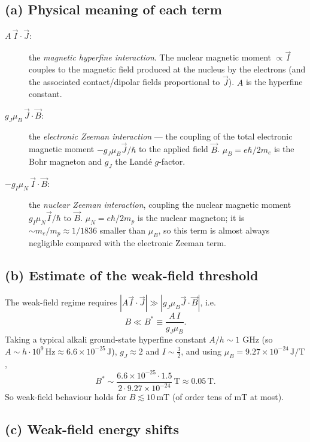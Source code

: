 \documentclass[11pt]{article}
\begin{document}
\subsection*{(a) Physical meaning of each term}

\begin{description}
    \item[$A\,\vec I\cdot\vec J$:] the \emph{magnetic hyperfine interaction}. The nuclear magnetic moment $\propto\vec I$ couples to the magnetic field produced at the nucleus by the electrons (and the associated contact/dipolar fields proportional to $\vec J$). $A$ is the hyperfine constant.
    \item[$g_J\mu_B\,\vec J\cdot\vec B$:] the \emph{electronic Zeeman interaction} — the coupling of the total electronic magnetic moment $-g_J\mu_B\vec J/\hbar$ to the applied field $\vec B$. $\mu_B=e\hbar/2m_e$ is the Bohr magneton and $g_J$ the Land\'e $g$-factor.
    \item[$-g_I\mu_N\,\vec I\cdot\vec B$:] the \emph{nuclear Zeeman interaction}, coupling the nuclear magnetic moment $g_I\mu_N\vec I/\hbar$ to $\vec B$. $\mu_N=e\hbar/2m_p$ is the nuclear magneton; it is $\sim m_e/m_p\approx 1/1836$ smaller than $\mu_B$, so this term is almost always negligible compared with the electronic Zeeman term.
\end{description}

\subsection*{(b) Estimate of the weak-field threshold}

The weak-field regime requires $|A\vec I\cdot\vec J|\gg |g_J\mu_B\vec J\cdot\vec B|$, i.e.\
\begin{equation*}
    B\ll B^* \equiv \frac{A\,I}{g_J\mu_B}.
\end{equation*}
Taking a typical alkali ground-state hyperfine constant $A/h\sim 1\text{ GHz}$ (so $A\sim h\cdot 10^9\,\text{Hz}\approx 6.6\times10^{-25}\,\text{J}$), $g_J\approx 2$ and $I\sim\tfrac32$, and using $\mu_B=9.27\times10^{-24}\,\text{J/T}$,
\begin{equation*}
    B^*\sim\frac{6.6\times10^{-25}\cdot 1.5}{2\cdot 9.27\times10^{-24}}\,\text{T}\approx 0.05\,\text{T}.
\end{equation*}
So weak-field behaviour holds for $B\lesssim 10\,\text{mT}$ (of order tens of mT at most).

\subsection*{(c) Weak-field energy shifts}
\end{document}
